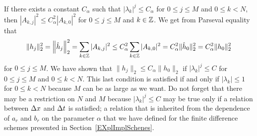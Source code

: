 If there exists a constant $C_\alpha$ such that $|\lambda_k|^j \leq C_\alpha$ for
$0 \leq j \leq M$ and $0 \leq k <N$,
then $|A_{k,j}|^2 \leq C_\alpha^2 |A_{k,0}|^2$ for $0 \leq j \leq M$ and
$k \in \mathbb{Z}$.  We get from Parseval equality that
\[
\|h_j\|_2^2 = \left\|\hat{h}_j\right\|_2^2
= \sum_{k\in \mathbb{Z}} |A_{k,j}|^2 \leq C_\alpha^2 \sum_{k\in \mathbb{Z}} |A_{k,0}|^2
= C_\alpha^2 \|\hat{h}_0\|_2^2 = C_\alpha^2 \|h_0\|_2^2
\]
for $0 \leq j \leq M$.
We have shown that $\|h_j\|_2 \leq C_\alpha \|h_0\|_2$ if
$|\lambda_k|^j \leq C$ for $0 \leq j \leq M$ and $0 \leq k < N$.
This last condition is satisfied if and only if
$|\lambda_k| \leq 1$ for $0\leq k < N$ because $M$ can be as
large as we want.  Do not forget that there may be a restriction on
$N$ and $M$ because $|\lambda_k|^j \leq C$ may be true only if
a relation between $\Delta{x}$ and $\Delta{t}$ is satisfied; a relation
that is inherited from the dependence of $a_r$ and $b_r$ on the
parameter $\alpha$ that we have defined for the finite difference
schemes presented in Section~\ref{EXplImplSchenes}.

